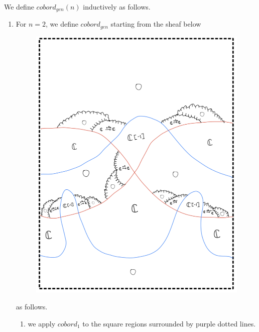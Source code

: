 \pagebreak
We define $cobord_{gen}(n)$ inductively as follows.
\begin{enumerate}[label = (\roman*)]
\item For $n=2$, we define $cobord_{gen}$ starting from the sheaf below
\begin{figure}[H]
    \centering
    \includegraphics[scale = 0.95]{diagrams/cobord_gen/base_1.png}
    \caption{}
    \label{fig:your-label}
\end{figure}
as follows.
\pagebreak
\begin{enumerate}[label = (Step \arabic*)]
\item we apply $cobord_1$ to the square regions surrounded by purple dotted lines.
\begin{figure}[H]
    \centering

\end{figure}
\end{enumerate}
\end{enumerate}
